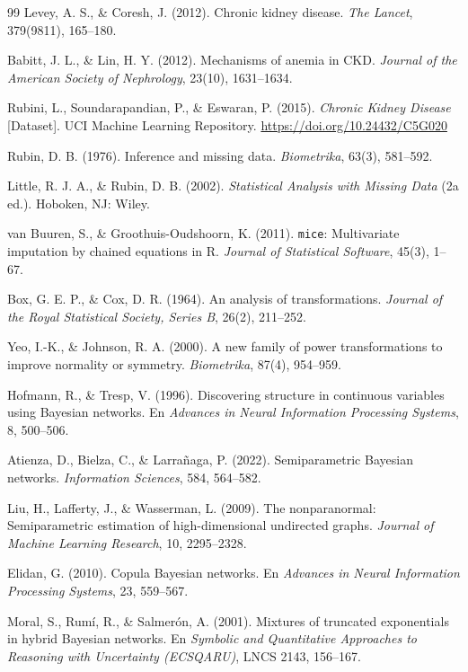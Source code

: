 \documentclass[11pt, a4paper]{article}
\begin{document}
\begin{thebibliography}{99}
 Levey, A. S., \& Coresh, J. (2012). Chronic kidney disease. \textit{The
Lancet}, 379(9811), 165--180.

 Babitt, J. L., \& Lin, H. Y. (2012). Mechanisms of anemia in CKD.
\textit{Journal of the American Society of Nephrology}, 23(10), 1631--1634.

 Rubini, L., Soundarapandian, P., \& Eswaran, P. (2015). \textit{Chronic Kidney
Disease} [Dataset]. UCI Machine Learning Repository.
\url{https://doi.org/10.24432/C5G020}

 Rubin, D. B. (1976). Inference and missing data. \textit{Biometrika}, 63(3),
581--592.

 Little, R. J. A., \& Rubin, D. B. (2002). \textit{Statistical Analysis with
Missing Data} (2a ed.). Hoboken, NJ: Wiley.

 van Buuren, S., \& Groothuis-Oudshoorn, K. (2011). \texttt{mice}:
Multivariate imputation by chained equations in R. \textit{Journal of Statistical Software}, 45(3),
1--67.

 Box, G. E. P., \& Cox, D. R. (1964). An analysis of transformations.
\textit{Journal of the Royal Statistical Society, Series B}, 26(2), 211--252.

 Yeo, I.-K., \& Johnson, R. A. (2000). A new family of power transformations to
improve normality or symmetry. \textit{Biometrika}, 87(4), 954--959.

 Hofmann, R., \& Tresp, V. (1996). Discovering structure in continuous
variables using Bayesian networks. En \textit{Advances in Neural Information Processing Systems},
8, 500--506.

 Atienza, D., Bielza, C., \& Larrañaga, P. (2022). Semiparametric Bayesian
networks. \textit{Information Sciences}, 584, 564--582.

 Liu, H., Lafferty, J., \& Wasserman, L. (2009). The nonparanormal:
Semiparametric estimation of high-dimensional undirected graphs. \textit{Journal of Machine
Learning Research}, 10, 2295--2328.

 Elidan, G. (2010). Copula Bayesian networks. En \textit{Advances in Neural
Information Processing Systems}, 23, 559--567.

 Moral, S., Rumí, R., \& Salmerón, A. (2001). Mixtures of truncated
exponentials in hybrid Bayesian networks. En \textit{Symbolic and Quantitative Approaches to
Reasoning with Uncertainty (ECSQARU)}, LNCS 2143, 156--167.


\end{thebibliography}
\end{document}
